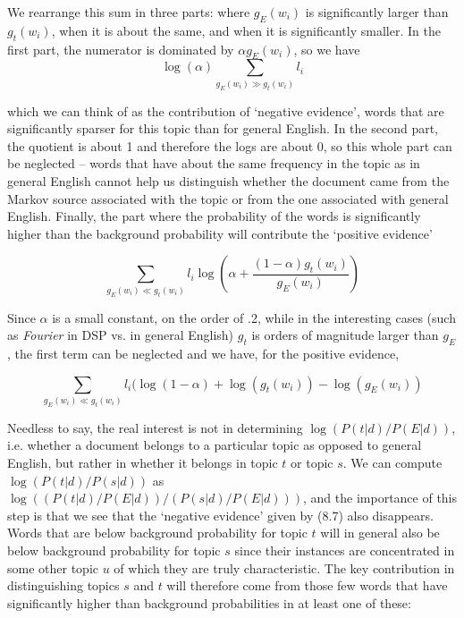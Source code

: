 \noindent
We rearrange this sum in three parts: where
$g_E(w_i)$ is significantly larger than $g_t(w_i)$, when it is about the same,
and when it is significantly smaller. In the first part, the numerator is
dominated by $\alpha g_E(w_i)$, so we have
\begin{equation}
\log(\alpha) \sum_{g_E(w_i) \gg g_t(w_i)} l_i
\end{equation}

\noindent
which we can think of as the contribution of `negative evidence', words that
are significantly sparser for this topic than for general English. In the
second part, the quotient is about 1 and therefore the logs are about 0, so
this whole part can be neglected -- words that have about the same frequency
in the topic as in general English cannot help us distinguish whether the
document came from the Markov source associated with the topic or from the one
associated with general English.  Finally, the part where the probability of
the words is significantly higher than the background probability will
contribute the `positive evidence'

$$\sum_{g_E(w_i) \ll g_t(w_i)} l_i \log \left(\alpha + \frac{(1-\alpha )
g_t(w_i)}{g_E(w_i)}\right)$$ 

\noindent
Since $\alpha$ is a small constant, on the order of .2, while in the
interesting cases (such as {\it Fourier} in DSP vs. in general English)
$g_t$ is orders of magnitude larger than $g_E$, the first term can be
neglected and we have, for the positive evidence, 

\begin{equation}
\sum_{g_E(w_i) \ll g_t(w_i)} l_i (\log(1-\alpha) +\log(g_t(w_i))-\log(g_E(w_i))
\end{equation}

\noindent
Needless to say, the real interest is not in determining
$\log(P(t|d)/P(E|d))$, i.e. whether a document belongs to a particular topic
as opposed to general English, but rather in whether it belongs in topic $t$
or topic $s$. We can compute $\log(P(t|d)/P(s|d))$ as
$\log((P(t|d)/P(E|d))/(P(s|d)/P(E|d)))$, and the importance of this step is
that we see that the `negative evidence' given by (8.7) also disappears. Words
that are below background probability for topic $t$ will in general also be
below background probability for topic $s$ since their instances are
concentrated in some other topic $u$ of which they are truly
characteristic. The key contribution in distinguishing topics $s$ and $t$ will
therefore come from those few words that have significantly higher than
background probabilities in at least one of these:

